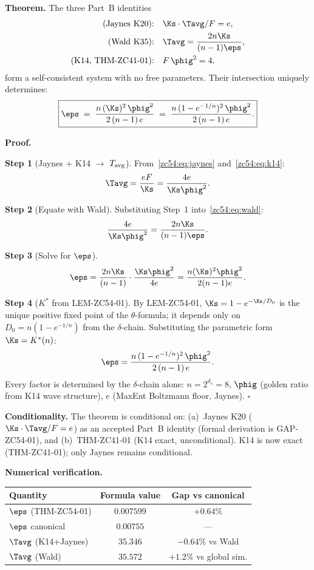 \documentclass[12pt, a4paper]{article}
\begin{document}
\begin{formalbox}[title={THM-ZC54-01: Wald Self-Consistency
  Theorem ($R_0$, Conditional on Jaynes K20)}]
\textbf{Theorem.}
The three Part~B identities
\begin{align}
  \text{(Jaynes K20):}\quad & \Ks\cdot\Tavg / F = e,
    \label{zc54:eq:jaynes} \\
  \text{(Wald K35):}\quad   & \Tavg = \frac{2n\Ks}{(n-1)\eps},
    \label{zc54:eq:wald} \\
  \text{(K14, THM-ZC41-01):}\quad & F\,\phig^2 = 4,
    \label{zc54:eq:k14}
\end{align}
form a self-consistent system with no free parameters.
Their intersection uniquely determines:
\begin{equation}\label{zc54:eq:eps-exact}
  \boxed{
  \eps
  \;=\; \frac{n\,(\Ks)^2\,\phig^2}{2\,(n-1)\,e}
  \;=\; \frac{n\,(1-e^{-1/n})^2\,\phig^2}{2\,(n-1)\,e}.
  }
\end{equation}

\textbf{Proof.}

\textbf{Step 1} (Jaynes + K14 $\to$ $T_{\rm avg}$).
From~\eqref{zc54:eq:jaynes} and~\eqref{zc54:eq:k14}:
\[
  \Tavg = \frac{eF}{\Ks} = \frac{4e}{\Ks\phig^2}.
\]

\textbf{Step 2} (Equate with Wald).
Substituting Step~1 into~\eqref{zc54:eq:wald}:
\[
  \frac{4e}{\Ks\phig^2}
  = \frac{2n\Ks}{(n-1)\eps}.
\]

\textbf{Step 3} (Solve for $\eps$).
\[
  \eps
  = \frac{2n\Ks}{(n-1)} \cdot \frac{\Ks\phig^2}{4e}
  = \frac{n(\Ks)^2\phig^2}{2(n-1)e}.
\]

\textbf{Step 4} ($K^*$ from LEM-ZC54-01).
By LEM-ZC54-01, $\Ks = 1 - e^{-\Ks/D_0}$ is the unique positive
fixed point of the $\theta$-formula; it depends only on
$D_0 = n(1-e^{-1/n})$ from the $\delta$-chain.
Substituting the parametric form $\Ks = K^*(n)$:
\[
  \eps = \frac{n\,(1-e^{-1/n})^2\,\phig^2}{2\,(n-1)\,e}.
\]
Every factor is determined by the $\delta$-chain alone:
$n=2^{d_s}=8$, $\phig$ (golden ratio from K14 wave structure),
$e$ (MaxEnt Boltzmann floor, Jaynes). \hfill$\square$

\textbf{Conditionality.}
The theorem is conditional on:
(a)~Jaynes K20 ($\Ks\cdot\Tavg/F = e$) as an accepted Part~B
identity (formal derivation is GAP-ZC54-01), and
(b)~THM-ZC41-01 (K14 exact, unconditional).
K14 is now exact (THM-ZC41-01); only Jaynes remains conditional.

\textbf{Numerical verification.}
\begin{center}
\begin{tabular}{@{}lcc@{}}
\toprule
Quantity & Formula value & Gap vs canonical \\
\midrule
$\eps$ (THM-ZC54-01) & $0.007599$ & $+0.64\%$ \\
$\eps$ canonical & $0.00755$ & --- \\
$\Tavg$ (K14+Jaynes) & $35.346$ & $-0.64\%$ vs Wald \\
$\Tavg$ (Wald) & $35.572$ & $+1.2\%$ vs global sim. \\
\bottomrule
\end{tabular}
\end{center}


\end{formalbox}
\end{document}
